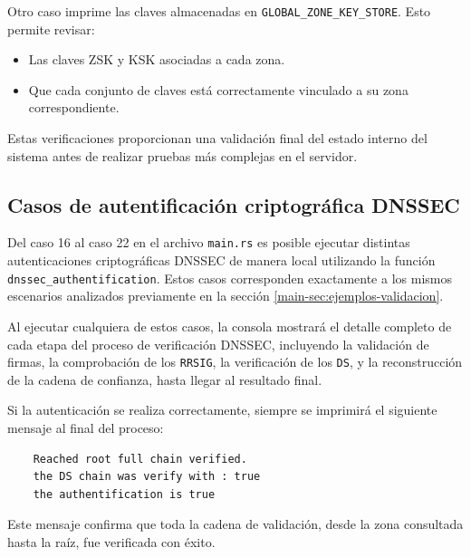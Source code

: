 Otro caso imprime las claves almacenadas en \texttt{GLOBAL\_ZONE\_KEY\_STORE}.  
Esto permite revisar:

\begin{itemize}
    \item Las claves ZSK y KSK asociadas a cada zona.
    \item Que cada conjunto de claves está correctamente vinculado a su zona correspondiente.
\end{itemize}

Estas verificaciones proporcionan una validación final del estado interno del sistema antes de realizar pruebas más complejas en el servidor.

\subsection{Casos de autentificación criptográfica DNSSEC}

Del caso 16 al caso 22 en el archivo \texttt{main.rs} es posible ejecutar distintas autenticaciones criptográficas DNSSEC de manera local utilizando la función \texttt{dnssec\_authentification}.
Estos casos corresponden exactamente a los mismos escenarios analizados previamente en la sección \ref{main-sec:ejemplos-validacion}.

Al ejecutar cualquiera de estos casos, la consola mostrará el detalle completo de cada etapa del proceso de verificación DNSSEC, incluyendo la validación de firmas, 
la comprobación de los \texttt{RRSIG}, la verificación de los \texttt{DS}, y la reconstrucción de la cadena de confianza, hasta llegar al resultado final.

Si la autenticación se realiza correctamente, siempre se imprimirá el siguiente mensaje al final del proceso:

\begin{lstlisting}
    Reached root full chain verified.
    the DS chain was verify with : true
    the authentification is true
\end{lstlisting}


Este mensaje confirma que toda la cadena de validación, desde la zona consultada hasta la raíz, fue verificada con éxito.
